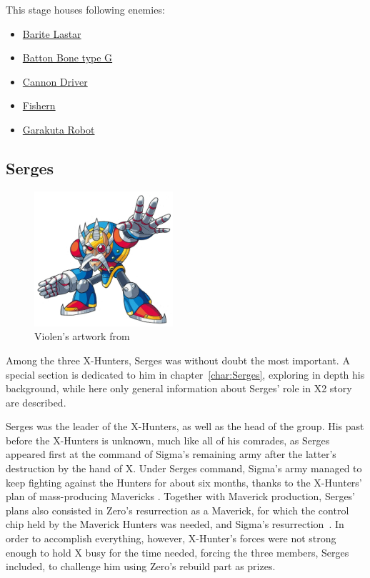 This stage houses following enemies:
\begin{itemize}
	\item \hyperlink{enem:Barite_Lastar}{Barite Lastar}
	\item \hyperlink{enem:Batton_Bone_type_G}{Batton Bone type G}
	\item \hyperlink{enem:Cannon_Driver}{Cannon Driver}
	\item \hyperlink{enem:Fishern}{Fishern}
	\item \hyperlink{enem:Garakuta_Robot}{Garakuta Robot}
\end{itemize}

\subsection{Serges}\label{boss:Serges}
\begin{figure}[htp]
	\centering
	\includegraphics[height=5cm]{figures/Characters/Char_Serges.png}
	\caption{Violen's artwork from \cite{book:MMX_Complete_art}}
\end{figure}
Among the three X-Hunters, Serges was without doubt the most important. A special section is dedicated to him in chapter~\ref{char:Serges}, exploring in depth his background, while here only general information about Serges' role in X2 story are described.

Serges was the leader of the X-Hunters, as well as the head of the group. His past before the X-Hunters is unknown, much like all of his comrades, as Serges appeared first at the command of Sigma's remaining army after the latter's destruction by the hand of X. Under Serges command, Sigma's army managed to keep fighting against the Hunters for about six months, thanks to the X-Hunters' plan of mass-producing Mavericks . Together with Maverick production, Serges' plans also consisted in Zero's resurrection as a Maverick, for which the control chip held by the Maverick Hunters was needed, and Sigma's resurrection~\cite{wayback:X2_resources}. In order to accomplish everything, however, X-Hunter's forces were not strong enough to hold X busy for the time needed, forcing the three members, Serges included, to challenge him using Zero's rebuild part as prizes. 

